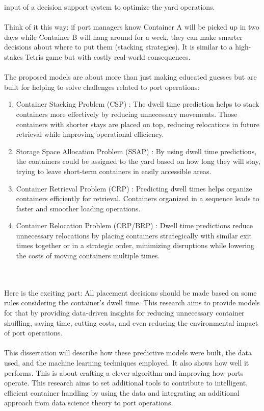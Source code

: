 	input of a decision support system to optimize the yard operations.
	\\
	\\
	Think of it this way: if port managers know Container A will be picked up in two days while Container B will hang
	around for a week, they can make smarter decisions about where to put them (stacking strategies). It is similar
	to a high-stakes Tetris game but with costly real-world consequences.
	\\
	\\
	The proposed models are about more than just making educated guesses but are built for helping to solve challenges
	related to port operations:

	\begin{enumerate}

		\item Container Stacking Problem (CSP) \cite{galle2018stochastic}: The dwell time prediction helps to stack
		containers more effectively by reducing unnecessary movements. Those containers with shorter stays are
		placed on top, reducing relocations in future retrieval while improving operational efficiency.

		\item
		Storage Space Allocation Problem (SSAP) \cite{da2019reactive}: By using dwell time predictions, the
		containers could be assigned to the yard based on how long they will stay, trying to leave short-term
		containers in easily accessible areas.

		\item
		Container Retrieval Problem (CRP) \cite{da2019reactive}
		: Predicting dwell times helps organize containers efficiently for retrieval.
		Containers organized in a sequence leads to faster and smoother loading operations.

		\item Container Relocation Problem (CRP/BRP) \cite{lin2015container}: Dwell time predictions reduce
		unnecessary relocations by placing containers strategically with similar exit times together or in a
		strategic order, minimizing disruptions while lowering the costs of moving containers multiple times.

	\end{enumerate}
	\\
	\\
	Here is the exciting part: All placement decisions should be made based on some rules considering the container's
	dwell time. This research aims to provide models for that by providing data-driven insights for reducing
	unnecessary container shuffling, saving time, cutting costs, and even reducing the environmental impact of port
	operations.
	\\
	\\
	This dissertation will describe how these predictive models were built, the data used, and the machine learning
	techniques employed. It also shows how well it performs. This is about crafting a clever algorithm and
	improving how
	ports operate. This research aims to set additional tools to contribute to intelligent, efficient container
	handling by using the data and integrating an additional approach from data science theory to port operations.


